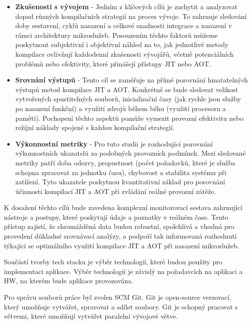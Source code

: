 \begin{itemize}
  \item \textbf{Zkušenosti s vývojem} - Jedním z klíčových cílů je zachytit a analyzovat dopad různých kompilačních strategií na proces vývoje. To zahrnuje sledování doby sestavení, cyklů nasazení a celkové snadnosti integrace a nasazení v rámci architektury mikroslužeb. Posouzením těchto faktorů můžeme poskytnout subjektivní i objektivní náhled na to, jak jednotlivé metody kompilace ovlivňují každodenní zkušenosti vývojářů, včetně potenciálních problémů nebo efektivity, které přinášejí přístupy JIT nebo AOT.
  \item \textbf{Srovnání výstupů} - Tento cíl se zaměřuje na přímé porovnání hmatatelných výstupů metod kompilace JIT a AOT. Konkrétně se bude sledovat velikost vytvořených spustitelných souborů, inicializační časy (jak rychle jsou služby po nasazení funkční) a využití zdrojů během běhu (využití procesoru a paměti). Pochopení těchto aspektů pomůže vymezit provozní efektivitu nebo režijní náklady spojené s každou kompilační strategií.
  \item \textbf{Výkonnostní metriky} - Pro tuto studii je rozhodující porovnání výkonnostních ukazatelů za podobných provozních podmínek. Mezi sledované metriky patří doba odezvy, propustnost (počet požadavků, které je služba schopna zpracovat za jednotku času), chybovost a stabilita systému při zatížení. Tyto ukazatele poskytnou kvantitativní základ pro porovnání účinnosti kompilací JIT a AOT při zvládání reálné provozní zátěže.
\end{itemize}

K dosažení těchto cílů bude zavedena komplexní monitorovací sestava zahrnující nástroje a postupy, které poskytují údaje a poznatky v reálném čase. Tento přístup zajistí, že shromážděná data budou robustní, spolehlivá a vhodná pro provedení důkladné srovnávací analýzy, a podpoří tak informovaná rozhodnutí týkající se optimálního využití kompilace JIT a AOT při nasazení mikroslužeb.


Součástí tvorby tech stacku je výběr technologií, které budou použity pro implementaci aplikace. Výběr technologií je závislý na požadavcích na aplikaci a HW, na kterém bude aplikace provozována.


Pro správu souborů práce byl zvolen SCM Git. Git je open-source verzovací, který umožňuje vytvářet, spravovat a sdílet soubory. Git je schopný pracovat s větvemi, které umožňují vytvářet paralelní vývojové větve.


